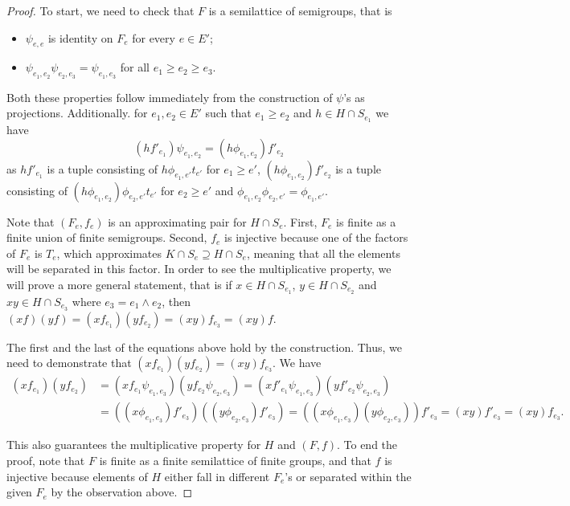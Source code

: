 \documentclass{article}
\theoremstyle{definition}
\begin{document}
\begin{proof}
To start, we need to check that $F$ is a semilattice of semigroups, that is 

\begin{itemize}
\item $\psi_{e,e}$ is identity on $F_e$ for every $e \in E'$;
\item $\psi_{e_1,e_2} \psi_{e_2,e_3} = \psi_{e_1,e_3}$  for all $e_1 \ge e_2 \ge e_3$.
\end{itemize}

Both these properties follow immediately from the construction of $\psi$'s as projections. Additionally. for $e_1,e_2 \in E'$  such that $e_1 \ge  e_2$ and $h \in H \cap S_{e_1}$ we have 
$$(h f'_{e_1})\psi_{e_1,e_2} =  (h \phi_{e_1,e_2}) f'_{e_2}$$ as $h f'_{e_1}$ is a tuple consisting of $h \phi_{e_1,e'} t_{e'}$ for $e_1 \ge e'$,  $(h \phi_{e_1,e_2}) f'_{e_2}$ is a tuple consisting of $(h \phi_{e_1,e_2}) \phi_{e_2,e'} t_{e'}$ for $e_2 \ge e'$ and  $\phi_{e_1,e_2} \phi_{e_2,e'} = \phi_{e_1,e'}$.

Note that $(F_e, f_e)$ is an approximating pair for $H\cap S_e$. First, $F_e$ is finite as a finite union of finite semigroups. Second, $f_e$ is injective because one of the factors of $F_e$ is $T_e$, which approximates $K \cap S_e \supseteq H\cap S_e$, meaning that all the elements will be separated in this factor. In order to see the multiplicative property, we will prove a more general statement, that is if $x \in H \cap S_{e_1}$, $y \in H \cap S_{e_2}$ and $xy \in H \cap S_{e_3}$ where $e_3 = e_1 \wedge e_2$, then $(x f) (yf) = (x f_{e_1}) (y f_{e_2}) = (xy) f_{e_3} = (xy) f$.

The first and the last of the equations above hold by the construction. Thus, we need to demonstrate that $(x f_{e_1}) (y f_{e_2}) = (xy) f_{e_3}$. We have
\begin{align*}
(x f_{e_1}) (y f_{e_2}) & =  (x  f_{e_1} \psi_{e_1,e_3}) (y f_{e_2} \psi_{e_2,e_3}) =  (x  f'_{e_1} \psi_{e_1,e_3}) (y f'_{e_2} \psi_{e_2,e_3}) \\
& = ((x \phi_{e_1,e_3})  f'_{e_3})  ((y  \phi_{e_2,e_3})f'_{e_3}) = ((x \phi_{e_1,e_3}) (y  \phi_{e_2,e_3})) f'_{e_3} = (xy) f'_{e_3} = (xy) f_{e_3}.
\end{align*}

This also guarantees the multiplicative property for $H$ and $(F,f)$. To end the proof, note that $F$ is finite as a finite semilattice of finite groups, and that $f$ is injective because elements of $H$ either fall in different $F_e$'s or separated within the given $F_e$ by the observation above.
\end{proof}
\end{document}
